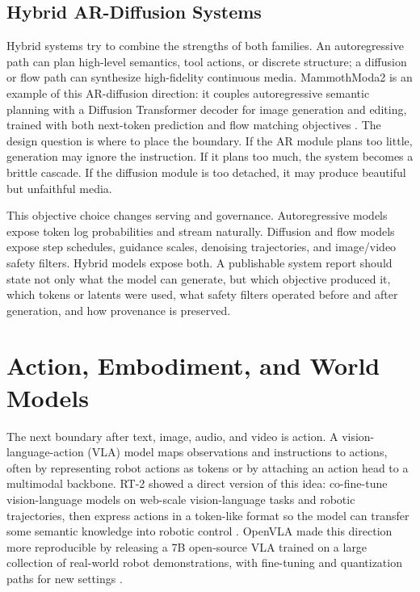 \subsection{Hybrid AR-Diffusion Systems}
Hybrid systems try to combine the strengths of both families. An autoregressive path can plan high-level semantics, tool actions, or discrete structure; a diffusion or flow path can synthesize high-fidelity continuous media. MammothModa2 is an example of this AR-diffusion direction: it couples autoregressive semantic planning with a Diffusion Transformer decoder for image generation and editing, trained with both next-token prediction and flow matching objectives \cite{shen2025mammothmoda2}. The design question is where to place the boundary. If the AR module plans too little, generation may ignore the instruction. If it plans too much, the system becomes a brittle cascade. If the diffusion module is too detached, it may produce beautiful but unfaithful media.

This objective choice changes serving and governance. Autoregressive models expose token log probabilities and stream naturally. Diffusion and flow models expose step schedules, guidance scales, denoising trajectories, and image/video safety filters. Hybrid models expose both. A publishable system report should state not only what the model can generate, but which objective produced it, which tokens or latents were used, what safety filters operated before and after generation, and how provenance is preserved.

\section{Action, Embodiment, and World Models}
\label{sec:action-embodiment-world-models}

The next boundary after text, image, audio, and video is action. A vision-language-action (VLA) model maps observations and instructions to actions, often by representing robot actions as tokens or by attaching an action head to a multimodal backbone. RT-2 showed a direct version of this idea: co-fine-tune vision-language models on web-scale vision-language tasks and robotic trajectories, then express actions in a token-like format so the model can transfer some semantic knowledge into robotic control \cite{brohan2023rt2}. OpenVLA made this direction more reproducible by releasing a 7B open-source VLA trained on a large collection of real-world robot demonstrations, with fine-tuning and quantization paths for new settings \cite{kim2024openvla}.

